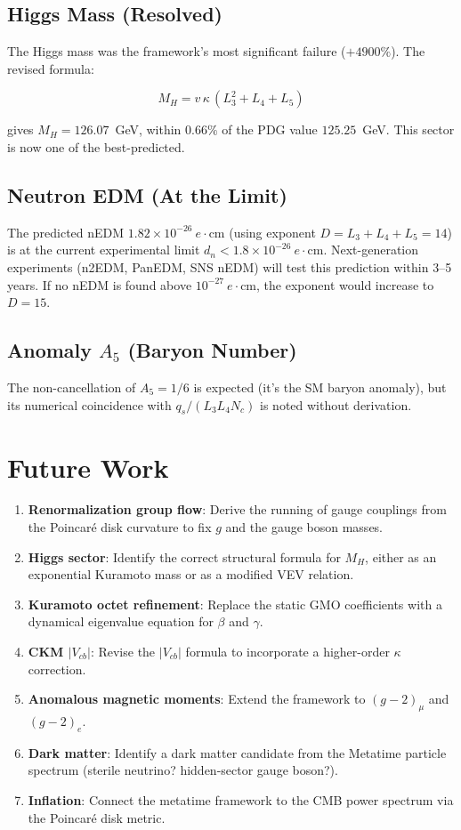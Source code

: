\subsection{Higgs Mass (Resolved)}

The Higgs mass was the framework's most significant failure
(\(+4900\%\)).  The revised formula:

\[
M_H = v\,\kappa\,(L_3^2 + L_4 + L_5)
\]

gives \(M_H = 126.07\)~GeV, within \(0.66\%\) of the PDG value
\(125.25\)~GeV.  This sector is now one of the best-predicted.

\subsection{Neutron EDM (At the Limit)}

The predicted nEDM \(1.82 \times 10^{-26}\ e\cdot\text{cm}\) (using
exponent \(D = L_3+L_4+L_5 = 14\)) is at the current experimental limit
\(d_n < 1.8 \times 10^{-26}\ e\cdot\text{cm}\).  Next-generation
experiments (n2EDM, PanEDM, SNS nEDM) will test this prediction within
3--5 years.  If no nEDM is found above \(10^{-27}\ e\cdot\text{cm}\), the
exponent would increase to \(D = 15\).

\subsection{Anomaly \(A_5\) (Baryon Number)}

The non-cancellation of \(A_5 = 1/6\) is expected (it's the SM baryon
anomaly), but its numerical coincidence with \(q_s/(L_3 L_4 N_c)\) is
noted without derivation.

\section{Future Work}

\begin{enumerate}
\item \textbf{Renormalization group flow}: Derive the running of gauge
couplings from the Poincar\'{e} disk curvature to fix \(g\) and the
gauge boson masses.
\item \textbf{Higgs sector}: Identify the correct structural formula for
\(M_H\), either as an exponential Kuramoto mass or as a modified VEV
relation.
\item \textbf{Kuramoto octet refinement}: Replace the static GMO
coefficients with a dynamical eigenvalue equation for \(\beta\) and
\(\gamma\).
\item \textbf{CKM \(|V_{cb}|\)}: Revise the \(|V_{cb}|\) formula to
incorporate a higher-order \(\kappa\) correction.
\item \textbf{Anomalous magnetic moments}: Extend the framework to
\((g-2)_\mu\) and \((g-2)_e\).
\item \textbf{Dark matter}: Identify a dark matter candidate from the
Metatime particle spectrum (sterile neutrino? hidden-sector gauge boson?).
\item \textbf{Inflation}: Connect the metatime framework to the CMB
power spectrum via the Poincar\'{e} disk metric.
\end{enumerate}
